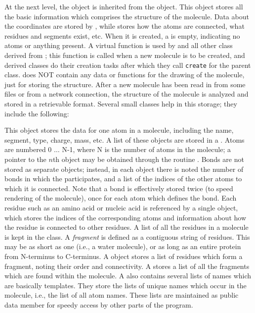 At the next level, the  object is inherited from the  object.  This object stores all the basic information which comprises the structure of the molecule.  Data about the coordinates are stored by , while  stores how the atoms are connected, what residues and segments exist, etc.  When it is created, a  is empty, indicating no atoms or anything present.  A virtual function  is used by  and all other class derived from ; this function is called when a new molecule is to be created, and derived classes do their creation tasks after which they call {\tt create} for the parent class.   does NOT contain any data or functions for the drawing of the molecule, just for storing the structure.  After a new molecule has been read in from some files or from a network connection, the structure of the molecule is analyzed and stored in a retrievable format.  Several small classes help in this storage; they include the following:
\begin{itemize}
This object stores the data for one atom in a molecule, including the name, segment, type, charge, mass, etc.  A list of these  objects are stored in a .  Atoms are numbered 0 $\ldots$ N-1, where N is the number of atoms in the molecule; a pointer to the $n$th  object may be obtained through the routine .  Bonds are not stored as separate objects; instead, in each  object there is noted the number of bonds in which the  participates, and a list of the indices of the other atoms to which it is connected.  Note that a bond is effectively stored twice (to speed rendering of the molecule), once for each atom which defines the bond.
Each residue such as an amino acid or nucleic acid is referenced by a single  object, which stores the indices of the corresponding atoms and information about how the residue is connected to other residues.  A list of all the residues in a molecule is kept in the  class.
A {\em fragment} is defined as a contiguous string of residues.  This may be as short as one (i.e., a water molecule), or as long as an entire protein from N-terminus to C-terminus.  A  object stores a list of residues which form a fragment, noting their order and connectivity.  A  stores a list of all the fragments which are found within the molecule.
A  also contains several lists of names which are basically  templates. They store the lists of unique names which occur in the molecule, i.e., the list of all atom names.  These lists are maintained as public data member for speedy access by other parts of the program.
\end{itemize}

